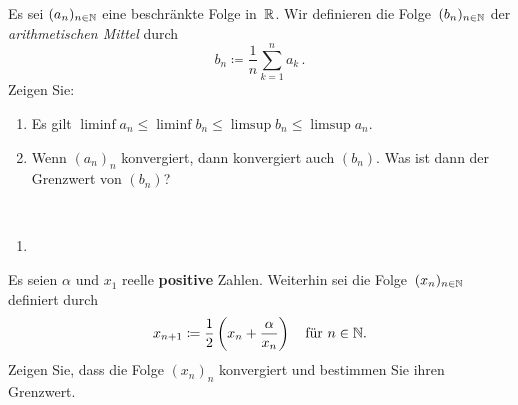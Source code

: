 \bigskip

\begin{aufg}[6 Punkte]
Es sei $(a_n)_{n\in\mathbb{N}}$ eine beschr\"ankte Folge in~$\mathbb{R}$. Wir definieren die Folge~$(b_n)_{n\in\mathbb{N}}$ der \emph{arithmetischen Mittel} durch
\[
 b_n \coloneqq \frac1n\sum_{k=1}^n a_k\,.
\]
Zeigen Sie:
\begin{enumerate}[label=$\mathrm{(\roman*)}$, ref=$\mathrm{\roman*}$]
\item Es gilt $\liminf a_n \leq \liminf b_n \leq \limsup b_n \leq \limsup a_n$.
\item Wenn $(a_n)_n$ konvergiert, dann konvergiert auch $(b_n)$. Was ist dann der Grenzwert von $(b_n)$?
\end{enumerate}
\end{aufg}
 
\bigskip

\begin{lsg}\mbox{ }
\begin{enumerate}[label=$\mathrm{(\roman*)}$, ref=$\mathrm{\roman*}$]
\item 
\end{enumerate}
\end{lsg}

\bigskip

\begin{aufg}[6 Punkte]
Es seien $\alpha$ und $x_1$ reelle \textbf{positive} Zahlen. Weiterhin sei die Folge~$(x_n)_{n\in\mathbb{N}}$ definiert durch 
\[
 x_{n+1} \coloneqq \frac12\left(x_n + \frac{\alpha}{x_n}\right) \quad\text{f\"ur $n\in\mathbb{N}$.}
\]
Zeigen Sie, dass die Folge $(x_n)_n$ konvergiert und bestimmen Sie ihren Grenzwert.
\end{aufg}

\bigskip


